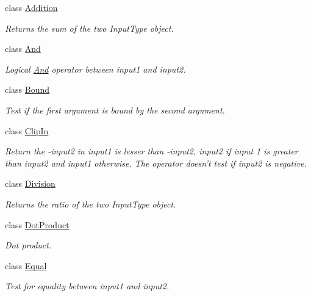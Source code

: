 \begin{DoxyCompactItemize}
\item 
class \hyperlink{classvct_binary_operations_1_1_addition}{Addition}
\begin{DoxyCompactList}\small\item\em Returns the sum of the two Input\-Type object. \end{DoxyCompactList}\item 
class \hyperlink{classvct_binary_operations_1_1_and}{And}
\begin{DoxyCompactList}\small\item\em Logical \hyperlink{classvct_binary_operations_1_1_and}{And} operator between input1 and input2. \end{DoxyCompactList}\item 
class \hyperlink{classvct_binary_operations_1_1_bound}{Bound}
\begin{DoxyCompactList}\small\item\em Test if the first argument is bound by the second argument. \end{DoxyCompactList}\item 
class \hyperlink{classvct_binary_operations_1_1_clip_in}{Clip\-In}
\begin{DoxyCompactList}\small\item\em Return the -\/input2 in input1 is lesser than -\/input2, input2 if input 1 is greater than input2 and input1 otherwise. The operator doesn't test if input2 is negative. \end{DoxyCompactList}\item 
class \hyperlink{classvct_binary_operations_1_1_division}{Division}
\begin{DoxyCompactList}\small\item\em Returns the ratio of the two Input\-Type object. \end{DoxyCompactList}\item 
class \hyperlink{classvct_binary_operations_1_1_dot_product}{Dot\-Product}
\begin{DoxyCompactList}\small\item\em Dot product. \end{DoxyCompactList}\item 
class \hyperlink{classvct_binary_operations_1_1_equal}{Equal}
\begin{DoxyCompactList}\small\item\em Test for equality between input1 and input2. \end{DoxyCompactList}\item 

\end{DoxyCompactItemize}
